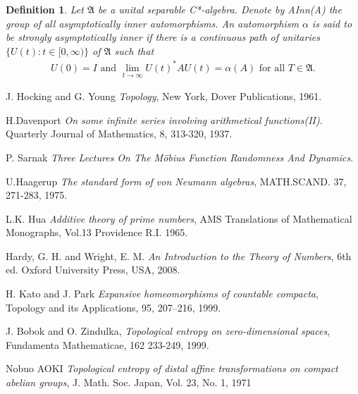 \documentclass[a4paper,10pt]{amsart}
\newtheorem{definition}{Definition}[section]
\newcommand{\AAA}{\mathfrak A}
\begin{document}
\begin{definition}
Let $\AAA$ be a unital separable C*-algebra. 
Denote by AInn(A)
the group of all asymptotically inner automorphisms. 
An automorphism $\alpha$ is said to be strongly asymptotically 
inner if there is a continuous path of unitaries 
$\{ U(t): t \in [0, \infty)\}$ of $\AAA$ such that
\begin{align*}
    U(0) = I \mbox{ and } \lim_{t \rightarrow \infty}U(t)^{*}AU(t) =
    \alpha(A) \mbox{ for all } T \in \AAA.
    \end{align*}
\end{definition}


\begin{thebibliography}{9}
   J. Hocking and G. Young
   \emph{Topology},
   New York, Dover Publications, 1961.

  H.Davenport
  \emph{On some infinite series involving arithmetical functions(II)}.
  Quarterly Journal of Mathematics, 8,
  313-320, 1937.

  P. Sarnak 
  \emph{Three Lectures On The M\"{o}bius Function Randomness And
  Dynamics}.

  U.Haagerup 
  \emph{The standard form of von Neumann algebras},
  MATH.SCAND. 37, 271-283, 1975.

    L.K. Hua
    \emph{Additive theory of prime numbers},
    AMS Translations of Mathematical Monographs, Vol.13
    Providence R.I. 1965.

      Hardy, G. H. and Wright, E. M. 
      \emph{An Introduction to the Theory of Numbers}, 
      6th ed. Oxford University Press, USA, 2008. 

  H. Kato and J. Park
  \emph{Expansive homeomorphisms of countable compacta},
  Topology and its Applications, 95, 207–216, 1999.

    J. Bobok and O. Zindulka,
    \emph{Topological entropy on zero-dimensional spaces},
    Fundamenta Mathematicae, 162 233-249, 1999.

    Nobuo AOKI
    \emph{Topological entropy of distal affine transformations
    on compact abelian groups},
    J. Math. Soc. Japan, Vol. 23, No. 1, 1971

\end{thebibliography}
\end{document}
